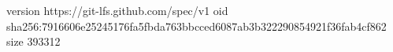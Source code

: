 version https://git-lfs.github.com/spec/v1
oid sha256:7916606e25245176fa5fbda763bbcced6087ab3b322290854921f36fab4cf862
size 393312
